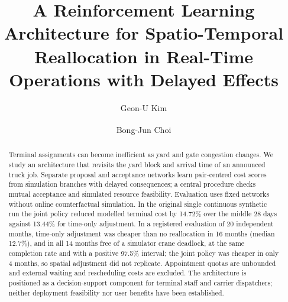 \documentclass[a4paper]{llncs}
\begin{document}
\raggedbottom

\title{A Reinforcement Learning Architecture for Spatio-Temporal
Reallocation in Real-Time Operations with Delayed Effects}

\author{Geon-U Kim \and Bong-Jun Choi\textsuperscript{\Letter}}

\maketitle

\begin{abstract}
Terminal assignments can become inefficient as yard and gate
congestion changes. We study an architecture that revisits the yard block
and arrival time of an announced truck job. Separate proposal and
acceptance networks learn pair-centred cost scores from simulation
branches with delayed consequences; a central procedure checks mutual
acceptance and simulated resource feasibility. Evaluation uses fixed
networks without online counterfactual simulation. In the original
single continuous synthetic run the joint policy reduced modelled
terminal cost by 14.72\% over the middle 28 days against 13.44\% for
time-only adjustment. In a registered evaluation of 20 independent
months, time-only adjustment was cheaper than no reallocation in
16 months (median 12.7\%), and in all 14 months free of a simulator crane
deadlock, at the same completion rate and with a positive 97.5\%
interval; the joint policy was cheaper in only 4 months, so spatial
adjustment did not replicate. Appointment
quotas are unbounded and external waiting and rescheduling costs are
excluded.
The architecture is positioned as a decision-support component for
terminal staff and carrier dispatchers; neither deployment feasibility
nor user benefits have been established.
\end{abstract}
\end{document}
